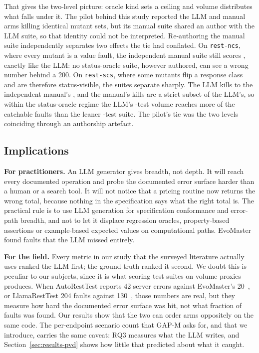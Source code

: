 That gives the two-level picture: oracle kind sets a ceiling and volume distributes what falls
under it. The pilot behind
this study reported the LLM and manual arms killing identical mutant sets, but its manual
suite shared an author with the LLM suite, so that identity could not be interpreted.
Re-authoring the manual suite independently separates two effects the tie had conflated. On
\texttt{rest-ncs}, where every mutant is a value fault, the independent manual suite still
scores \RQIINcsManual{}, exactly like the LLM: no status-oracle suite, however authored, can
see a wrong number behind a 200. On \texttt{rest-scs}, where some mutants flip a response
class and are therefore status-visible, the suites separate sharply. The LLM kills
\RQIIScsLlm{} to the independent manual's \RQIIScsManual{}, and the manual's kills are a
strict subset of the LLM's, so within the status-oracle regime the LLM's \PDtestsLlm{}-test
volume reaches more of the catchable faults than the leaner \PDtestsManual{}-test suite. The
pilot's tie was the two levels coinciding through an authorship artefact.

\subsection{Implications}

\textbf{For practitioners.} An LLM generator gives breadth, not depth. It will reach every
documented operation and probe the documented error surface harder than a human or a search
tool. It will not notice that a pricing routine now returns the wrong
total, because nothing in the specification says what the right total is. The practical rule
is to use LLM generation for specification conformance and error-path breadth, and not to let
it displace regression oracles, property-based assertions or example-based expected values on
computational paths. EvoMaster found \RQIImcnemarLEc{} faults that the LLM missed entirely.

\textbf{For the field.} Every metric in our study that the surveyed literature actually uses
ranked the LLM first; the ground truth ranked it second. We doubt this is peculiar to our
subjects, since it is what scoring test suites on volume proxies produces. When AutoRestTest
reports 42 server errors against EvoMaster's 20~\cite{autoresttest}, or LlamaRestTest 204
faults against 130~\cite{llamaresttest}, those numbers are real, but they measure how hard the
documented error surface was hit, not what fraction of faults was found. Our results show that
the two can order arms oppositely on the same code. The per-endpoint scenario count that GAP-M
asks for, and that we introduce, carries the same caveat: RQ3 measures what the LLM writes,
and Section~\ref{sec:results-pvd} shows how little that predicted about what it caught.

